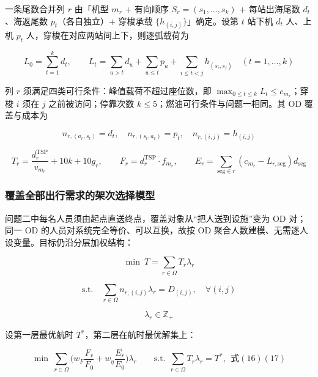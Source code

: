 \documentclass[UTF8,zihao=-4]{ctexart}
\numberwithin{figure}{section}
\numberwithin{table}{section}
\begin{document}
一条尾数合并列 $r$ 由「机型 $m_r$ + 有向顺序 $S_r=(s_1,\dots,s_k)$ + 每站出海尾数 $d_t$、海返尾数 $p_t$（各自独立）+ 穿梭承载 $\{h_{(i,j)}\}$」确定。设第 $t$ 站下机 $d_t$ 人、上机 $p_t$ 人，穿梭在对应两站间上下，则逐弧载荷为

\begin{equation}
  L_0=\sum_{t=1}^{k}d_t,\qquad
  L_t=\sum_{u>t} d_u+\sum_{u\le t} p_u+\sum_{i\le t<j} h_{(s_i,s_j)}\quad(t=1,\dots,k)
\end{equation}

列 $r$ 须满足四类可行条件：峰值载荷不超过座位数，即 $\max_{0\le t\le k}L_t\le c_{m_r}$；穿梭 $i$ 须在 $j$ 之前被访问；停靠次数 $k\le5$；燃油可行条件与问题一相同。其 OD 覆盖与成本为

\begin{equation}
  n_{r,(a_r,s_t)}=d_t,\quad n_{r,(s_t,a_r)}=p_t,\quad n_{r,(i,j)}=h_{(i,j)}
\end{equation}

\begin{equation}
  T_r=\frac{d_r^{\mathrm{TSP}}}{v_{m_r}}+10k+10g_r,\qquad
  F_r=d_r^{\mathrm{TSP}}\cdot f_{m_r},\qquad
  E_r=\sum_{\text{seg}\in r}(c_{m_r}-L_{r,\text{seg}})d_{\text{seg}}
\end{equation}

\subsubsection{覆盖全部出行需求的架次选择模型}

问题二中每名人员须由起点直送终点，覆盖对象从“把人送到设施”变为 OD 对；同一 OD 的人员对系统完全等价、可以互换，故按 OD 聚合人数建模、无需逐人设变量。目标仍沿分层加权结构：

\begin{equation}
  \min\ T=\sum_{r\in\Omega} T_r\lambda_r
\end{equation}

\begin{equation}
  \text{s.t.}\quad \sum_{r\in\Omega} n_{r,(i,j)}\lambda_r=D_{(i,j)},\quad\forall(i,j)
\end{equation}

\begin{equation}
  \lambda_r\in\mathbb{Z}_+
\end{equation}

设第一层最优航时 $T^*$，第二层在航时最优解集上：

\begin{equation}
  \min\ \sum_{r\in\Omega}\Big(w_F\frac{F_r}{F_0}+w_\eta\frac{E_r}{E_0}\Big)\lambda_r
  \qquad\text{s.t.}\ \ \sum_{r\in\Omega}T_r\lambda_r=T^*,\ \ \text{式}(16)(17)
\end{equation}
\end{document}
